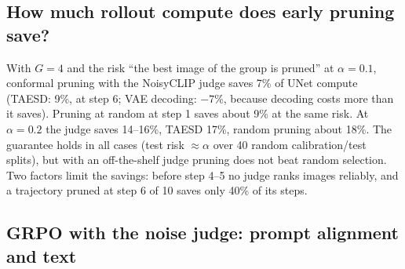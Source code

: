 \documentclass{article}
\begin{document}
\subsection{How much rollout compute does early pruning save?}
\label{sec:res_prune}
With $G=4$ and the risk ``the best image of the group is pruned'' at $\alpha=0.1$, conformal pruning with the NoisyCLIP judge
saves 7\% of UNet compute (TAESD: 9\%, at step 6; VAE decoding: $-7\%$, because decoding costs more than it saves). Pruning at
random at step 1 saves about 9\% at the same risk. At $\alpha=0.2$ the judge saves 14--16\%, TAESD 17\%, random pruning
about 18\%. The guarantee holds in all cases (test risk $\approx\alpha$ over 40 random calibration/test splits), but with an
off-the-shelf judge pruning does not beat random selection. Two factors limit the savings: before step 4--5 no judge ranks
images reliably, and a trajectory pruned at step 6 of 10 saves only 40\% of its steps.

\subsection{GRPO with the noise judge: prompt alignment and text}
\label{sec:res_grpo}
\end{document}
